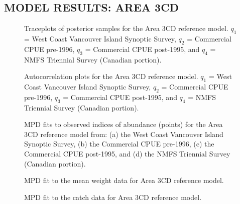 \documentclass[11pt]{book}
\begin{document}
\hypertarget{model-results-area-3cd}{%
\subsection{MODEL RESULTS: AREA 3CD}\label{model-results-area-3cd}}
\begin{figure}[htb]

{\centering {} 

}

\caption{Traceplots of posterior samples for the Area 3CD reference model. $q_1$ = West Coast Vancouver Island Synoptic Survey, $q_2$ = Commercial CPUE pre-1996, $q_3$ = Commercial CPUE post-1995, and $q_4$ = NMFS Triennial Survey (Canadian portion).}\label{fig:fig-base-mcmc-trace-3cd}
\end{figure}
\begin{figure}[htb]

{\centering {} 

}

\caption{Autocorrelation plots for the Area 3CD reference model. $q_1$ = West Coast Vancouver Island Synoptic Survey, $q_2$ = Commercial CPUE pre-1996, $q_3$ = Commercial CPUE post-1995, and $q_4$ = NMFS Triennial Survey (Canadian portion).}\label{fig:fig-base-mcmc-autocor-3cd}
\end{figure}
\begin{figure}[htb]

{\centering {} 

}

\caption{MPD fits to observed indices of abundance (points) for the Area 3CD reference model from: (a) the West Coast Vancouver Island Synoptic Survey, (b) the Commercial CPUE pre-1996, (c) the Commercial CPUE post-1995, and (d) the NMFS Triennial Survey (Canadian portion).}\label{fig:fig-base-index-fits-3cd}
\end{figure}
\begin{figure}[htb]

{\centering {} 

}

\caption{MPD fit to the mean weight data for Area 3CD reference model.}\label{fig:fig-base-mean-weight-3cd}
\end{figure}
\begin{figure}[htb]

{\centering {} 

}

\caption{MPD fit to the catch data for Area 3CD reference model.}\label{fig:fig-base-catch-fit-3cd}
\end{figure}
\end{document}
